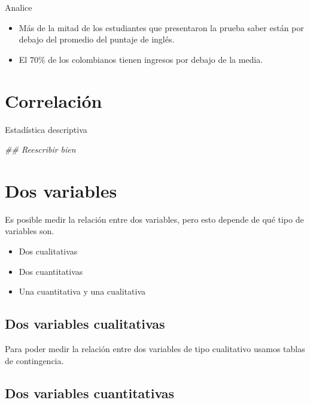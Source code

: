 \documentclass[
  letterpaper,
  DIV=11,
  numbers=noendperiod]{scrreprt}
\newenvironment{Shaded}{\begin{snugshade}}{\end{snugshade}}
\newcommand{\DocumentationTok}[1]{\textcolor[rgb]{0.37,0.37,0.37}{\textit{#1}}}
\providecommand{\tightlist}{%
  \setlength{\itemsep}{0pt}\setlength{\parskip}{0pt}}\usepackage{longtable,booktabs,array}
\begin{document}
Analice

\begin{itemize}
\item
  Más de la mitad de los estudiantes que presentaron la prueba saber
  están por debajo del promedio del puntaje de inglés.
\item
  El 70\% de los colombianos tienen ingresos por debajo de la media.
\end{itemize}

\chapter{Correlación}\label{correlaciuxf3n}

Estadística descriptiva

\hfill\break

\begin{Shaded}
\begin{Highlighting}[]
\DocumentationTok{\#\# Reescribir bien}
\end{Highlighting}
\end{Shaded}

\chapter{Dos variables}\label{dos-variables}

Es posible medir la relación entre dos variables, pero esto depende de
qué tipo de variables son.

\begin{itemize}
\tightlist
\item
  Dos cualitativas
\item
  Dos cuantitativas
\item
  Una cuantitativa y una cualitativa
\end{itemize}

\section{Dos variables cualitativas}\label{dos-variables-cualitativas}

Para poder medir la relación entre dos variables de tipo cualitativo
usamos tablas de contingencia.

\section{Dos variables cuantitativas}\label{dos-variables-cuantitativas}
\end{document}
